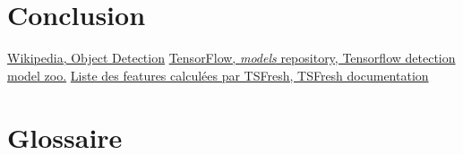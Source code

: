 \documentclass[french]{article}
\theoremstyle{mytheoremstyle}
\theoremstyle{mytheoremstyle}
\theoremstyle{myproblemstyle}
\begin{document}
    \section{Conclusion}

\renewcommand\refname{7\indent Références}
\begin{thebibliography}{1}
 \href{https://en.wikipedia.org/wiki/Object\_detection}{Wikipedia, Object Detection}
 \href{https://github.com/tensorflow/models/blob/master/research/object_detection/g3doc/detection_model_zoo.md#coco-trained-models}{TensorFlow, \textit{models} repository, Tensorflow detection model zoo.}
 \href{https://tsfresh.readthedocs.io/en/latest/text/list_of_features.html}{Liste des features calculées par TSFresh, TSFresh documentation}
\end{thebibliography}
\clearpage

\section*{Glossaire}
\end{document}
